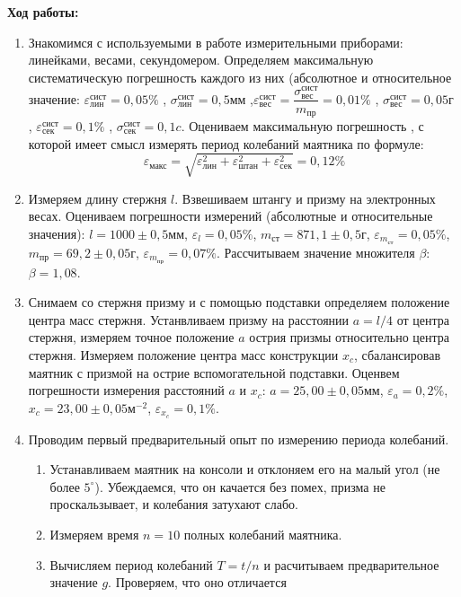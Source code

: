 \documentclass[a4paper, 12pt]{article}
\begin{document}

\textbf{Ход работы:}
\begin{enumerate}
\item Знакомимся с используемыми в работе измерительными приборами: линейками, весами, секундомером. Определяем максимальную систематическую погрешность каждого из них (абсолютное и относительное значение: $\varepsilon_{\text{лин}}^{\text{сист}} = 0,05\% $ , $\sigma_{\text{лин}}^{\text{сист}} = 0,5 \text{мм}$ ,$\varepsilon_{\text{вес}}^{\text{сист}} = \dfrac{\sigma_{\text{вес}}^{\text{сист}}}{m_{\text{пр}}} = 0,01\% $ , $\sigma_{\text{вес}}^{\text{сист}} = 0,05\text{г}$ , $\varepsilon_{\text{сек}}^{\text{сист}} = 0,1\% $ , $\sigma_{\text{сек}}^{\text{сист}} = 0,1c$. Оцениваем максимальную погрешность , с которой имеет смысл измерять период колебаний маятника по формуле:
\[\varepsilon_{\text{макс}} = \sqrt{\varepsilon_{\text{лин}}^2 + \varepsilon_{\text{штан}}^2 + \varepsilon_{\text{сек}}^2} =  0,12 \%\] 
\item Измеряем длину стержня $l$. Взвешиваем штангу и призму на электронных весах. Оцениваем погрешности измерений (абсолютные и относительные значения): 
$l = 1000 \pm 0,5 \text{мм}$, $\varepsilon_l = 0,05\%$, $m_{\text{ст}} = 871,1\pm 0,5 \text{г}$, $\varepsilon_{m_{\text{ст}}} = 0,05\%$, $m_{\text{пр}} = 69,2\pm 0,05\text{г}$, $\varepsilon_{m_{\text{пр}}} = 0,07\%$. Рассчитываем значение множителя $\beta$: $\beta = 1,08$.
\item Снимаем со стержня призму и с помощью подставки определяем положение центра масс стержня. Устанвливаем призму на расстоянии $ a = l / 4$ от центра стержня, измеряем точное положение $a$ острия призмы относительно центра стержня. Измеряем положение центра масс конструкции $x_c$, сбалансировав маятник с призмой на острие вспомогательной подставки. Оценвем погрешности измерения расстояний $a$ и $x_c$: $a = 25,00 \pm 0,05 \text{мм}$, $\varepsilon_a = 0,2\%$, $x_c = 23,00 \pm 0,05\text{м}^{-2}$, $\varepsilon_{x_c} = 0,1\%$.
\item Проводим первый предварительный опыт по измерению периода колебаний. 
\begin{enumerate}
\item Устанавливаем маятник на консоли и отклоняем его на малый
угол (не более $5^{\circ}$). Убеждаемся, что он качается без помех, призма
не проскальзывает, и колебания затухают слабо.
\item Измеряем время $n = 10$ полных колебаний маятника.
\item Вычисляем период колебаний $T = t/n$ и расчитываем предварительное значение $g$. Проверяем, что оно отличается

\end{enumerate}
\end{enumerate}
\end{document}
